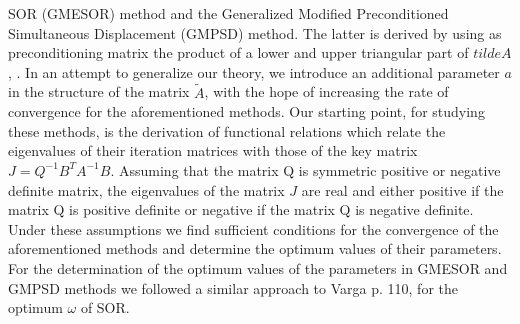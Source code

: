 \documentclass{report}
\begin{document}
SOR (GMESOR) method and the Generalized Modified Preconditioned
Simultaneous Displacement (GMPSD) method. The latter is derived by using
as preconditioning matrix the product of a lower and upper triangular
part of $tilde A$ \cite{Louka}, \cite{LoukMis2}.
In an attempt to generalize our theory, we introduce an additional
parameter $a$ in the structure of the matrix $\tilde A$, with the hope of
increasing the rate of convergence for the aforementioned methods. Our
starting point, for studying these methods, is the derivation of
functional relations which relate the eigenvalues of their iteration
matrices with those of the key matrix $J=Q^{-1}B^TA^{-1}B$. Assuming that
the matrix Q is symmetric positive or negative definite matrix, the
eigenvalues of the matrix $J$ are real and either positive if the matrix
Q is positive definite or negative if the matrix Q is negative definite.
Under these assumptions we find sufficient conditions for the convergence
of the aforementioned methods and determine the optimum values of their
parameters. For the determination of the optimum values of the parameters
in GMESOR and GMPSD methods we followed a similar approach to Varga
\cite{Var1} p. 110, for the optimum $\omega$ of SOR.
\end{document}
